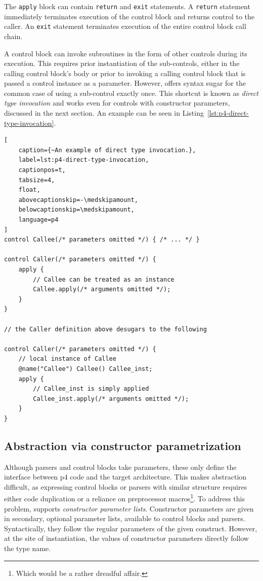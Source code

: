 The \texttt{apply} block can contain \texttt{return} and \texttt{exit}
statements. A \texttt{return} statement immediately terminates execution of the
control block and returns control to the caller. An \texttt{exit} statement
terminates execution of the entire control block call chain.

A control block can invoke subroutines in the form of other controls during its
execution. This requires prior instantiation of the sub-controls, either in the
calling control block's body or prior to invoking a calling control block that
is passed a control instance as a parameter. However, \pfs offers syntax sugar
for the common case of using a sub-control exactly once. This shortcut is known
as \emph{direct type invocation} and works even for controls with constructor
parameters, discussed in the next section. An example can be seen in
Listing~\ref{lst:p4-direct-type-invocation}.

\begin{lstlisting}[
	caption={~An example of direct type invocation.},
	label=lst:p4-direct-type-invocation,
	captionpos=t,
	tabsize=4,
	float,
	abovecaptionskip=-\medskipamount,
	belowcaptionskip=\medskipamount,
	language=p4
]
control Callee(/* parameters omitted */) { /* ... */ }

control Caller(/* parameters omitted */) {
	apply {
		// Callee can be treated as an instance
		Callee.apply(/* arguments omitted */);
	}
}

// the Caller definition above desugars to the following

control Caller(/* parameters omitted */) {
	// local instance of Callee
	@name("Callee") Callee() Callee_inst;
	apply {
		// Callee_inst is simply applied
		Callee_inst.apply(/* arguments omitted */);
	}
}

\end{lstlisting}

\subsection*{Abstraction via constructor parametrization}

Although parsers and control blocks take parameters, these only define the
interface between \acrshort{p4} code and the target architecture. This makes
abstraction difficult, as expressing control blocks or parsers with similar
structure requires either code duplication or a reliance on preprocessor
macros\footnote{Which would be a rather dreadful affair.}. To address this
problem, \pfs supports \emph{constructor parameter lists}. Constructor
parameters are given in secondary, optional parameter lists, available to
control blocks and parsers. Syntactically, they follow the regular parameters of
the given construct. However, at the site of instantiation, the values of
constructor parameters directly follow the type name.


